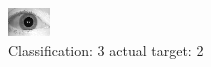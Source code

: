 \begin{figure}[h!]
\begin{center}
\includegraphics[width=0.60\columnwidth]{figures/ID1667_class_3_target_2.png}
\end{center}
\caption{ Classification: 3 actual target: 2}
\label{fig:ID1667_class_3_target_2}
\end{figure}
